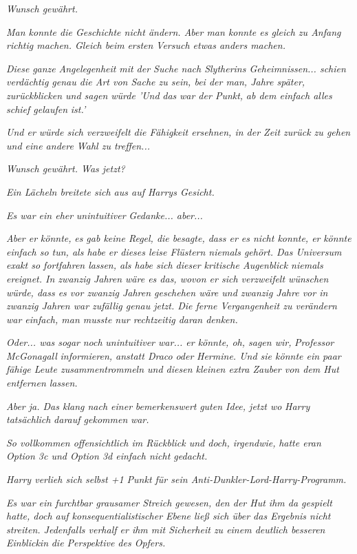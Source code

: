 {\emph{Wunsch gewährt.}

\emph{Man konnte die Geschichte nicht ändern. Aber man konnte es gleich zu Anfang richtig machen. Gleich beim} \emph{\emph{ersten}} \emph{Versuch etwas anders machen.}

\emph{Diese} \emph{ganze} \emph{Angelegenheit} \emph{mit der Suche nach Slytherins Geheimnissen... schien verdächtig genau die Art von Sache zu sein, bei der man, Jahre später, zurückblicken und sagen würde 'Und} \emph{\emph{das}} \emph{war der Punkt,} \emph{ab dem einfach alles schief gelaufen} \emph{ist.'}

\emph{Und er würde sich verzweifelt die Fähigkeit ersehnen, in der Zeit zurück zu gehen und eine andere Wahl zu treffen...}

\emph{Wunsch gewährt. Was jetzt?}

\emph{Ein Lächeln breitete sich aus auf Harrys Gesicht.}

\emph{Es war ein eher} \emph{\emph{unintuitiver}} \emph{Gedanke... aber...}

\emph{Aber er} \emph{\emph{könnte,}} \emph{es gab keine Regel, die besagte, dass er es nicht konnte, er} \emph{\emph{könnte}} \emph{einfach so tun, als habe er dieses leise Flüstern niemals gehört. Das Universum exakt so fortfahren lassen, als habe sich dieser kritische Augenblick niemals ereignet. In zwanzig Jahren wäre es das, wovon er sich verzweifelt wünschen würde, dass es vor zwanzig Jahren geschehen wäre und zwanzig Jahre vor in zwanzig Jahren war zufällig genau jetzt. Die ferne Vergangenheit zu verändern war einfach, man musste nur rechtzeitig daran denken.}

\emph{Oder... was sogar} \emph{\emph{noch}} \emph{unintuitiver war... er könnte, oh, sagen wir,} \emph{\emph{Professor McGonagall}} \emph{informieren, anstatt Draco} \emph{\emph{oder}} \emph{Hermine. Und sie könnte ein paar fähige Leute zusammentrommeln und diesen kleinen extra Zauber von dem Hut entfernen lassen.}

\emph{Aber ja. Das klang nach einer} \emph{\emph{bemerkenswert}} \emph{guten Idee, jetzt wo} \emph{Harry tatsächlich} \emph{\emph{darauf gekommen}} \emph{war.}

\emph{So vollkommen offensichtlich im Rückblick und doch, irgendwie,} \emph{hatte eran} \emph{Option 3c und Option 3d einfach nicht gedacht.}

\emph{Harry verlieh sich selbst +1 Punkt für sein Anti-Dunkler-Lord-Harry-Programm.}

\emph{Es war ein furchtbar grausamer Streich gewesen, den der Hut ihm da gespielt hatte, doch auf konsequentialistischer Ebene ließ sich über das Ergebnis nicht streiten. Jedenfalls verhalf er ihm mit Sicherheit zu einem deutlich besseren} \emph{Einblickin} \emph{die Perspektive des Opfers.}

}
